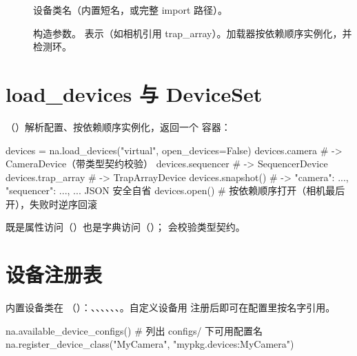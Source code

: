 \documentclass[11pt,oneside,openany]{book}
\begin{document}

\begin{description}
  \item[] 设备类名（内置短名，或完整 import 路径）。
  \item[] 构造参数。 表示（如相机引用 trap\_array）。加载器按依赖顺序实例化，并检测环。
\end{description}

\section{load\_devices 与 DeviceSet}
（）解析配置、按依赖顺序实例化，返回一个  容器：

\begin{codeblock}[Python]
devices = na.load_devices("virtual", open_devices=False)
devices.camera        # -> CameraDevice（带类型契约校验）
devices.sequencer     # -> SequencerDevice
devices.trap_array    # -> TrapArrayDevice
devices.snapshot()    # -> {"camera": {...}, "sequencer": {...}, ...} JSON 安全自省
devices.open()        # 按依赖顺序打开（相机最后开），失败时逆序回滚
\end{codeblock}

 既是属性访问（）也是字典访问（）； 会校验类型契约。

\section{设备注册表}
内置设备类在 （）：、、、、、、。自定义设备用  注册后即可在配置里按名字引用。

\begin{codeblock}[Python]
na.available_device_configs()   # 列出 configs/ 下可用配置名
na.register_device_class("MyCamera", "mypkg.devices:MyCamera")
\end{codeblock}
\end{document}
